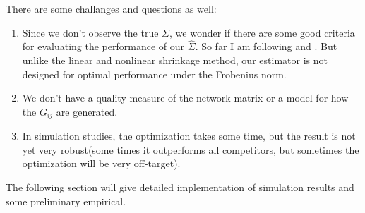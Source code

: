 There are some challanges and questions as well:
\begin{enumerate}
    \item Since we don't observe the true \(\Sigma\), we wonder if there are some good criteria for evaluating the performance of our \(\hat{\Sigma}\). So far I am following \cite{ledoit2004HoneyShrunk} and \cite{ledoit2017NonlinearShrinkage}. But unlike the linear and nonlinear shrinkage method, our estimator is not designed for optimal performance under the Frobenius norm. 
    \item We don't have a quality measure of the network matrix or a model for how the \(G_{ij}\) are generated. 
    \item In simulation studies, the optimization takes some time, but the result is not yet very robust(some times it outperforms all competitors, but sometimes the optimization will be very   off-target).
\end{enumerate}
The following section will give detailed implementation of simulation results and some preliminary empirical.  